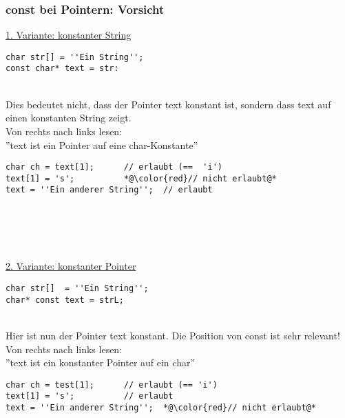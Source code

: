 \subsubsection{const bei Pointern: Vorsicht\hfill}
\label{sec:unterunterabschnitt}
\underline{1. Variante: konstanter String}\\
\noindent
\begin{minipage}{\linewidth}
\begin{lstlisting}
char str[] = ''Ein String'';
const char* text = str:
\end{lstlisting}
\end{minipage}
\\
Dies bedeutet nicht, dass der Pointer text konstant ist, sondern dass text auf einen konstanten String zeigt.\\
Von rechts nach links lesen:\\ ''text ist ein Pointer auf eine char-Konstante''\\
\noindent
\begin{minipage}{\linewidth}
\begin{lstlisting}
char ch = text[1];		// erlaubt (==  'i')
text[1] = 's';			*@\color{red}// nicht erlaubt@*
text = ''Ein anderer String'';	// erlaubt
\end{lstlisting}
\end{minipage}
\\ \\ \\ \\
\underline{2. Variante: konstanter Pointer}\\
\noindent
\begin{minipage}{\linewidth}
\begin{lstlisting}
char str[]  = ''Ein String'';
char* const text = strL;
\end{lstlisting}
\end{minipage}
\\
Hier ist nun der Pointer text konstant. Die Position von const ist sehr relevant!\\
Von rechts nach links lesen:\\ ''text ist ein konstanter Pointer auf ein char''\\
\noindent
\begin{minipage}{\linewidth}
\begin{lstlisting}
char ch = test[1];		// erlaubt (== 'i')
text[1] = 's';			// erlaubt
text = ''Ein anderer String'';	*@\color{red}// nicht erlaubt@*
\end{lstlisting}
\end{minipage}
